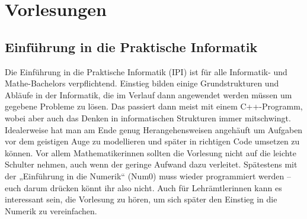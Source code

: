 \section{Vorlesungen}

\subsection{Einführung in die Praktische Informatik}
\label{info1}
Die Einführung in die Praktische Informatik (\gls{IPI}) ist für alle Informatik- und Mathe-Bachelors verpflichtend. Einstieg bilden einige Grundstrukturen und Abläufe in der Informatik, die im Verlauf dann angewendet werden müssen um gegebene Probleme zu lösen. Das passiert dann meist mit einem C++-Programm, wobei aber auch das Denken in informatischen Strukturen immer mitschwingt. Idealerweise hat man am Ende genug Herangehensweisen angehäuft um Aufgaben vor dem geistigen Auge zu modellieren und später in richtigen Code umsetzen zu können. Vor allem Mathematikerinnen sollten die Vorlesung nicht auf die leichte Schulter nehmen, auch wenn der geringe Aufwand dazu verleitet. Spätestens mit der „Einführung in die Numerik“ (\gls{Num0}) muss wieder programmiert werden -- euch darum drücken könnt ihr also nicht. Auch für Lehrämtlerinnen kann es interessant sein, die Vorlesung zu hören, um sich später den Einstieg in die Numerik zu vereinfachen.
